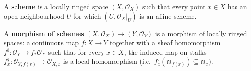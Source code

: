 \begin{definition}[Scheme]
    \label{def:scheme}
    \notready
    A \textbf{scheme} is a locally ringed space $(X, \mathcal{O}_X)$ such that every point $x \in X$ has an open neighbourhood $U$ for which $(U, \mathcal{O}_X|_U)$ is an affine scheme.
\end{definition}

\begin{definition}
    \label{def:scheme-hom}
    \notready
    A \textbf{morphism of schemes} $(X, \mathcal{O}_X) \to (Y, \mathcal{O}_Y)$ is a morphism of locally ringed spaces: a continuous map $f \colon X \to Y$ together with a sheaf homomorphism $f^\sharp \colon \mathcal{O}_Y \to f_*\mathcal{O}_X$ such that for every $x \in X$, the induced map on stalks $f^\sharp_x \colon \mathcal{O}_{Y,f(x)} \to \mathcal{O}_{X,x}$ is a local homomorphism (i.e.\ $f^\sharp_x(\mathfrak{m}_{f(x)}) \subseteq \mathfrak{m}_x$).
\end{definition}


